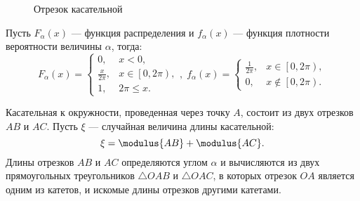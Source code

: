 \begin{figure}[h]
    \caption{Отрезок касательной}
\end{figure}

Пусть $F_\alpha(x)$ --- функция распределения и $f_\alpha(x)$ --- функция плотности вероятности величины $\alpha$, тогда:
\begin{equation}
    \label{506:f_alpha}
    F_\alpha(x)
    = \left \{
    \begin{array}{ll}
        0,                & x < 0 ,                          \\
        \frac{x}{2 \pi} , & x \in \left [ 0, 2 \pi \right ), \\
        1 ,               & 2 \pi \le x .
    \end{array}
    \right .
    , \;
    f_\alpha(x)
    = \left \{
    \begin{array}{ll}
        \frac{1}{2 \pi} , & x \in \left [ 0, 2 \pi \right ),     \\
        0 ,               & x \notin \left [ 0, 2 \pi \right ) .
    \end{array}
    \right .
\end{equation}

Касательная к окружности, проведенная через точку $A$, состоит из двух отрезков $AB$ и $AC$. Пусть $\xi$ --- случайная величина длины касательной:
\begin{equation}
    \xi = \modulus{AB} + \modulus{AC} .
\end{equation}
Длины отрезков $AB$ и $AC$ определяются углом $\alpha$ и вычисляются из двух прямоугольных треугольников $\triangle OAB$ и $\triangle OAC$, в которых отрезок $OA$ является
одним из катетов, и искомые длины отрезков другими катетами.

